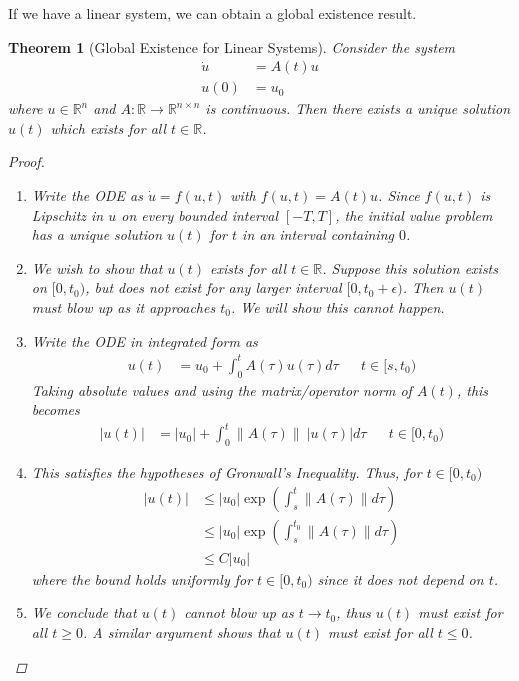 \documentclass[12pt]{amsart}         %
\newtheorem{theorem}{Theorem}[section]
\theoremstyle{remark}
\newcommand{\R}{\mathbb{R}}
\begin{document}
If we have a linear system, we can obtain a global existence result. 
\begin{theorem}[Global Existence for Linear Systems]
Consider the system
\begin{align*}
\dot{u} &= A(t) u \\
u(0) &= u_0
\end{align*}
where $u \in \R^n$ and $A:\R \rightarrow \R^{n \times n}$ is continuous. Then there exists a unique solution $u(t)$ which exists for all $t \in \R$.
\begin{proof}
\begin{enumerate}
\item Write the ODE as $\dot{u} = f(u, t)$ with $f(u,t) = A(t) u$. Since $f(u, t)$ is Lipschitz in $u$ on every bounded interval $[-T, T]$, the initial value problem has a unique solution $u(t)$ for $t$ in an interval containing $0$. 
\item We wish to show that $u(t)$ exists for all $t \in \R$. Suppose this solution exists on $[0, t_0)$, but does not exist for any larger interval $[0, t_0 + \epsilon)$. Then $u(t)$ must blow up as it approaches $t_0$. We will show this cannot happen.
\item Write the ODE in integrated form as
\begin{align*}
u(t) &= u_0 + \int_0^t A(\tau)u(\tau)d\tau && t \in [s, t_0)
\end{align*}
Taking absolute values and using the matrix/operator norm of $A(t)$, this becomes
\begin{align*}
|u(t)| &= |u_0| + \int_0^t \|A(\tau)\|\:|u(\tau)|d\tau && t \in [0, t_0)
\end{align*}
\item This satisfies the hypotheses of Gronwall's Inequality. Thus, for $t \in [0, t_0)$
\begin{align*}
|u(t)| &\leq |u_0| \exp \left( \int_s^t \|A(\tau)\| d\tau \right) \\
&\leq |u_0| \exp \left( \int_s^{t_0} \|A(\tau)\| d\tau \right) \\
&\leq C |u_0|
\end{align*}
where the bound holds uniformly for $t \in [0, t_0)$ since it does not depend on $t$.
\item We conclude that $u(t)$ cannot blow up as $t \rightarrow t_0$, thus $u(t)$ must exist for all $t \geq 0$. A similar argument shows that $u(t)$ must exist for all $t \leq 0$.
\end{enumerate}
\end{proof}
\end{theorem}
\end{document}
